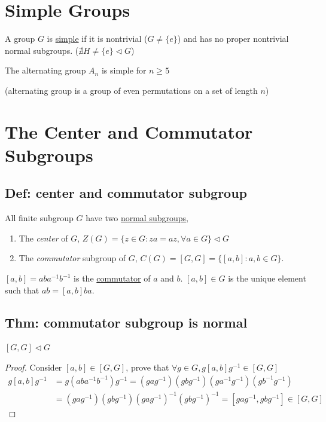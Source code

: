 \documentclass[11pt]{elegantbook}
\begin{document}
\section{Simple Groups}
\begin{definition}
    A group $G$ is \underline{simple} if it is nontrivial ($G\neq \{e\}$) and has no proper nontrivial normal subgroups. ($\nexists H\neq \{e\} \lhd G$)
\end{definition}
\begin{theorem}
    The alternating group $A_n$ is simple for $n\geq 5$

    (alternating group is a group of even permutations on a set of length $n$)
\end{theorem}


\section{The Center and Commutator Subgroups}
\subsection{Def: center and commutator subgroup}
\begin{theorem}
All finite subgroup $G$ have two \underline{normal subgroups},
\end{theorem}
\begin{enumerate}[(1)]
    \item The \textit{center} of $G$, $Z(G)=\{z\in G: za=az,\forall a\in G\}\lhd G$
    \item The \textit{commutator} subgroup of $G$, $C(G)=[G,G]=\{[a,b]:a,b\in G\}$.
\end{enumerate}
\begin{definition}
$[a,b]=aba^{-1}b^{-1}$ is the \underline{commutator} of $a$ and $b$. $[a,b]\in G$ is the unique element such that $ab=[a,b]ba$.
\end{definition}

\subsection{Thm: commutator subgroup is normal}
\begin{theorem}
$[G,G]\lhd G$
\end{theorem}
\begin{proof}
Consider $[a,b]\in [G,G]$, prove that $\forall g\in G, g[a,b]g^{-1}\in [G,G]$
\begin{equation}
    \begin{aligned}
        g[a,b]g^{-1}&=g(aba^{-1}b^{-1})g^{-1}=(gag^{-1})(gbg^{-1})(ga^{-1}g^{-1})(gb^{-1}g^{-1})\\
        &=(gag^{-1})(gbg^{-1})(gag^{-1})^{-1}(gbg^{-1})^{-1}=[gag^{-1},gbg^{-1}]\in[G,G]
    \end{aligned}
    \nonumber
\end{equation}
\end{proof}
\end{document}
